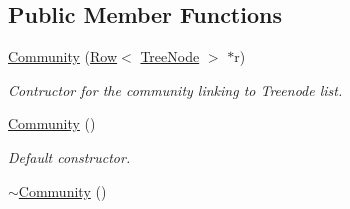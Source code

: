 \subsection*{Public Member Functions}
\begin{DoxyCompactItemize}
\item 
\hyperlink{class_community_a7697e887d12366a6953fe7439d978768}{Community} (\hyperlink{class_row}{Row}$<$ \hyperlink{class_tree_node}{Tree\+Node} $>$ $\ast$r)
\begin{DoxyCompactList}\small\item\em Contructor for the community linking to Treenode list. \end{DoxyCompactList}\item 
\hyperlink{class_community_a995bd6adbfb7a4aad1bc5fb74e2a8ef2}{Community} ()\hypertarget{class_community_a995bd6adbfb7a4aad1bc5fb74e2a8ef2}{}\label{class_community_a995bd6adbfb7a4aad1bc5fb74e2a8ef2}

\begin{DoxyCompactList}\small\item\em Default constructor. \end{DoxyCompactList}\item 
\hyperlink{class_community_a9ed3b94e90b38497805610de6d18df4e}{$\sim$\+Community} ()\hypertarget{class_community_a9ed3b94e90b38497805610de6d18df4e}{}\label{class_community_a9ed3b94e90b38497805610de6d18df4e}


\end{DoxyCompactItemize}

